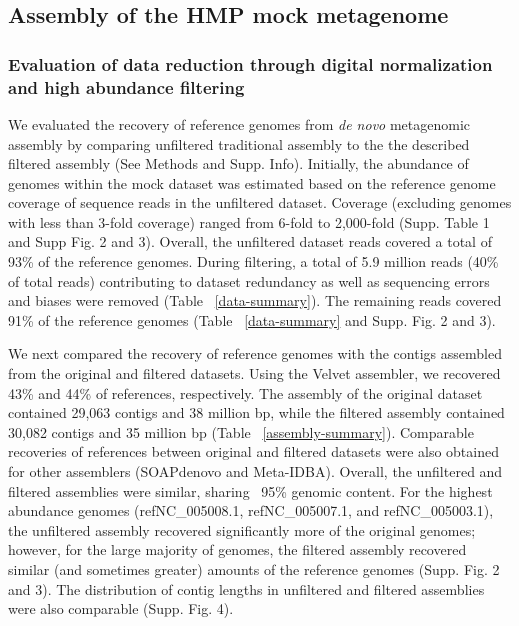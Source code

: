 \documentclass[11pt]{article} %
\begin{document}
\subsection{Assembly of the HMP mock metagenome}

\subsubsection{Evaluation of data reduction through digital normalization 
and high abundance filtering}

We evaluated the recovery of reference genomes from {\em de novo}
metagenomic assembly by comparing unfiltered traditional assembly to
the the described filtered assembly (See Methods and
Supp. Info). Initially, the abundance of genomes within the mock
dataset was estimated based on the reference genome coverage of
sequence reads in the unfiltered dataset.  Coverage (excluding genomes
with less than 3-fold coverage) ranged from 6-fold to 2,000-fold
(Supp. Table 1 and Supp Fig. 2 and 3).  Overall, the
unfiltered dataset reads covered a total of 93\% of the reference
genomes.  During filtering, a total of 5.9 million reads (40\% of
total reads) contributing to dataset redundancy as well as sequencing errors
and biases were removed (Table ~\ref{data-summary}).  The remaining
reads covered 91\% of the reference genomes
(Table ~\ref{data-summary} and Supp. Fig. 2 and 3).

We next compared the recovery of reference genomes with the contigs
assembled from the original and filtered datasets.  Using the Velvet
assembler, we recovered 43\% and 44\% of references, respectively.  The
assembly of the original dataset contained 29,063 contigs and 38
million bp, while the filtered assembly contained 30,082 contigs and
35 million bp (Table ~\ref{assembly-summary}).  Comparable recoveries
of references between original and filtered datasets were also
obtained for other assemblers (SOAPdenovo and Meta-IDBA).  Overall,
the unfiltered and filtered assemblies were similar, sharing ~95\%
genomic content.  For the highest abundance genomes
(ref\textbar{}NC\_005008.1, ref\textbar{}NC\_005007.1, and
ref\textbar{}NC\_005003.1), the unfiltered assembly recovered
significantly more of the original genomes; however, for the large
majority of genomes, the filtered assembly recovered similar (and
sometimes greater) amounts of the reference genomes (Supp. Fig. 2 and
3).  The distribution of contig lengths in unfiltered and filtered
assemblies were also comparable (Supp. Fig. 4).
\end{document}
